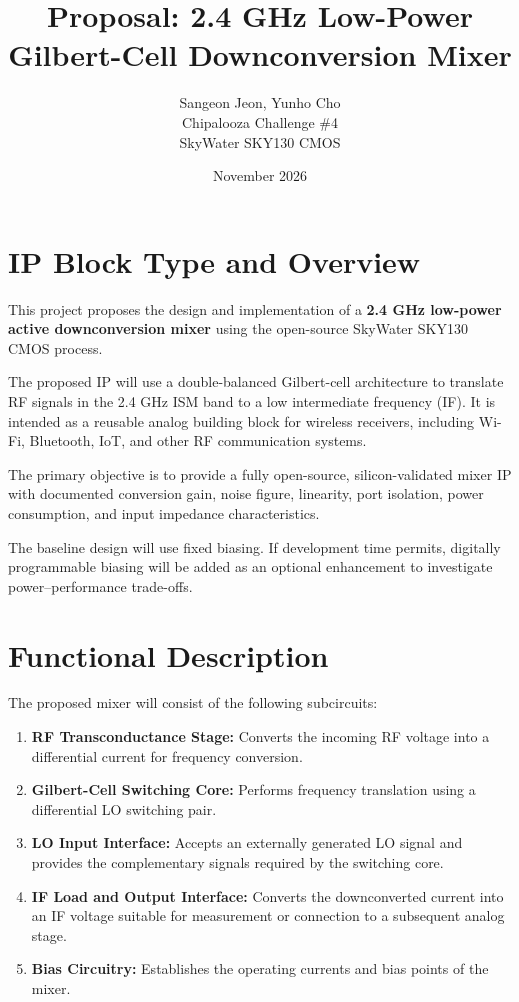 \documentclass[11pt,letterpaper]{article}
\title{
    \textbf{Proposal: 2.4 GHz Low-Power\\
    Gilbert-Cell Downconversion Mixer}
}
\author{
    Sangeon Jeon, Yunho Cho \\
    Chipalooza Challenge \#4\\
    SkyWater SKY130 CMOS
}
\date{November 2026}
\begin{document}
\maketitle

\section{IP Block Type and Overview}

This project proposes the design and implementation of a
\textbf{2.4 GHz low-power active downconversion mixer}
using the open-source SkyWater SKY130 CMOS process.

The proposed IP will use a double-balanced Gilbert-cell
architecture to translate RF signals in the 2.4 GHz ISM
band to a low intermediate frequency (IF). It is intended
as a reusable analog building block for wireless receivers,
including Wi-Fi, Bluetooth, IoT, and other RF communication
systems.

The primary objective is to provide a fully open-source,
silicon-validated mixer IP with documented conversion gain,
noise figure, linearity, port isolation, power consumption,
and input impedance characteristics.

The baseline design will use fixed biasing. If development
time permits, digitally programmable biasing will be added
as an optional enhancement to investigate
power--performance trade-offs.


\section{Functional Description}

The proposed mixer will consist of the following
subcircuits:

\begin{enumerate}
    \item \textbf{RF Transconductance Stage:}
    Converts the incoming RF voltage into a differential
    current for frequency conversion.

    \item \textbf{Gilbert-Cell Switching Core:}
    Performs frequency translation using a differential
    LO switching pair.

    \item \textbf{LO Input Interface:}
    Accepts an externally generated LO signal and
    provides the complementary signals required by the
    switching core.

    \item \textbf{IF Load and Output Interface:}
    Converts the downconverted current into an IF voltage
    suitable for measurement or connection to a
    subsequent analog stage.

    \item \textbf{Bias Circuitry:}
    Establishes the operating currents and bias points
    of the mixer.
\end{enumerate}
\end{document}
